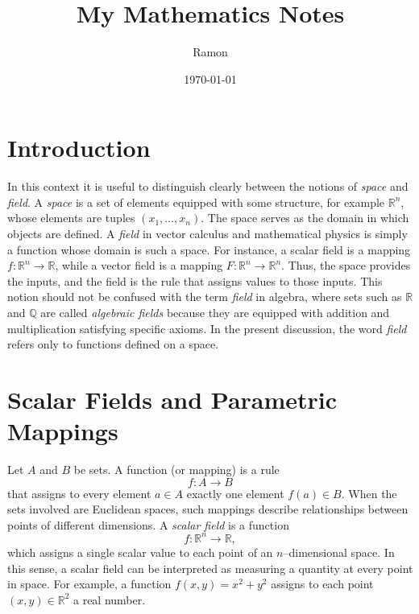 \documentclass{article}
\begin{document}
	
	\title{My Mathematics Notes}
	\author{Ramon}
	\date{\today}
	
	\maketitle
	
	\section{Introduction}
		In this context it is useful to distinguish clearly between the notions of \emph{space} and \emph{field}. A \emph{space} is a set of elements equipped with some structure, for example $\mathbb{R}^n$, whose elements are tuples $(x_1,\dots,x_n)$. The space serves as the domain in which objects are defined. A \emph{field} in vector calculus and mathematical physics is simply a function whose domain is such a space. For instance, a scalar field is a mapping $f:\mathbb{R}^n\to\mathbb{R}$, while a vector field is a mapping $F:\mathbb{R}^n\to\mathbb{R}^n$. Thus, the space provides the inputs, and the field is the rule that assigns values to those inputs. This notion should not be confused with the term \emph{field} in algebra, where sets such as $\mathbb{R}$ and $\mathbb{Q}$ are called \emph{algebraic fields} because they are equipped with addition and multiplication satisfying specific axioms. In the present discussion, the word \emph{field} refers only to functions defined on a space.
	
	\section{Scalar Fields and Parametric Mappings}
	
	   Let $A$ and $B$ be sets. A function (or mapping) is a rule
	   \[
	      f : A \to B
	    \]
	that assigns to every element $a \in A$ exactly one element $f(a) \in B$. When the sets involved are Euclidean spaces, such mappings describe relationships between points of different dimensions. A \emph{scalar field} is a function
	\[
	f : \mathbb{R}^n \to \mathbb{R},
	\]
	which assigns a single scalar value to each point of an $n$--dimensional space. In this sense, a scalar field can be interpreted as measuring a quantity at every point in space. For example, a function $f(x,y)=x^2+y^2$ assigns to each point $(x,y)\in\mathbb{R}^2$ a real number. 
	
\end{document}
